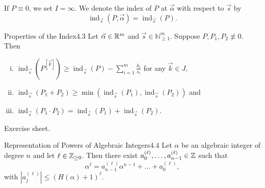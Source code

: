 \documentclass{Vorlesungstemplate_English} %
\renewcommand{\N}{\mathbb{N}_{\geq 1}}
\begin{document}
If $P \equiv 0$, we set $I = \infty$. We denote the index of $P$ at $\vec\alpha$ with respect to $\vec s$ by
\[ \operatorname{ind}_{\vec s}(P, \vec\alpha) = \operatorname{ind}_{\vec s}(P).\]
\begin{lemma}{Properties of the Index}{4.3}
  Let $\vec\alpha \in \mathbb{R}^m$ and $\vec s \in \N^m$. Suppose $P, P_1, P_2 \not\equiv 0$. Then
  \begin{enumerate}[(i)]
    \item $\operatorname{ind}_{\vec s}(P^{[\vec k]}) \geq \operatorname{ind}_{\vec s}(P) - \sum_{i=1}^m\frac{k_i}{s_i}$ for any $\vec k \in J$,
    \item $\operatorname{ind}_{\vec s}(P_1 + P_2) \geq \min\left(\operatorname{ind}_{\vec s}(P_1), \operatorname{ind}_{\vec s}(P_2)\right)$ and
    \item $\operatorname{ind}_{\vec s}(P_1 \cdot P_2) = \operatorname{ind}_{\vec s}(P_1) + \operatorname{ind}_{\vec s}(P_2)$.
  \end{enumerate}
\end{lemma}
\begin{pf}
  Exercise sheet.
\end{pf}
\begin{lemma}{Representation of Powers of Algebraic Integers}{4.4}
  Let $\alpha$ be an algebraic integer of degree $n$ and let $\ell \in \mathbb{Z}_{\geq 0}$. Then there exist $a_0^{(\ell)}, \dots, a_{n-1}^{(\ell)} \in \mathbb{Z}$ such that
  \[ \alpha^{\ell} = a_{n-1}^{(\ell)}\alpha^{n-1} + \dots + a_0^{(\ell)},\]
  with $|a_j^{(\ell)}| \leq (H(\alpha) + 1)^{\ell}$.
\end{lemma}
\end{document}
